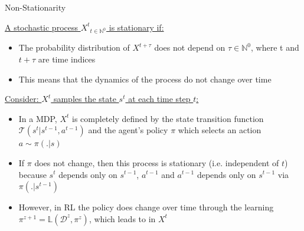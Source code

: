 \begin{frame}{Non-Stationarity}

\underline{A stochastic process ${X^t}_{t \in \mathbb{N}^0}$ is stationary if:}

\begin{itemize}
    \item The probability distribution of $X^{t + \tau}$ does not depend on $\tau \in \mathbb{N}^0$, where t and $t + \tau$ are time indices
    \item This means that the dynamics of the process do not change over time
\end{itemize}

\pause

\underline{Consider: $X^t$ samples the state $s^t$ at each time step $t$:}

\begin{itemize}
    \item<2-> In a MDP, $X^t$ is completely defined by the state transition function $\mathcal{T}(s^t|s^{t-1}, a^{t-1})$ and the agent's policy $\pi$ which selects an action $a \sim \pi(.|s)$
    \item<3-> If $\pi$ does not change, then this process is stationary (i.e. independent of $t$) because $s^t$ depends only on $s^{t-1}$, $a^{t-1}$ and $a^{t-1}$ depends only on  $s^{t-1}$ via $\pi(.|s^{t-1})$
    \item<4-> However, in RL the policy does change over time through the learning $\pi^{z+1} = \mathbb{L}(\mathcal{D}^z, \pi^z)$,  which leads to  in $X^t$
\end{itemize}

\end{frame}

